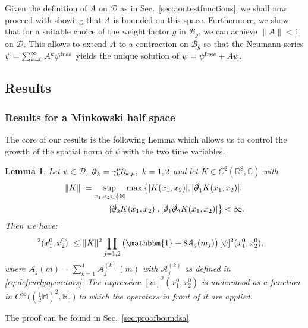 \documentclass[b5paper,draft,openbib,12pt]{memoir}
\newtheorem{Lemma}[Def]{Lemma}
\newcommand{\R}{\mathbb{R}}
\newcommand{\CC}{\mathbb{C}}
\newcommand{\M}{\mathbb{M}}
\newcommand{\id}{\mathbbm{1}}
\newcommand{\free}{{\textup free}}
\newcommand{\Banach}{\mathscr{B}}
\begin{document}
Given the definition of $A$ on $\mathscr{D}$ as in Sec.\ 
\ref{sec:aontestfunctions}, we shall now proceed with showing that 
$A$ is bounded on this space. Furthermore, we show that for a 
suitable choice of the weight factor $g$ in $\Banach_g$, we can 
achieve $\| A\| < 1$ on $\mathscr{D}$. This allows to extend $A$ to 
a contraction on $\Banach_g$ so that the Neumann series 
$\psi = \sum_{k=0}^\infty A^k \psi^\free$ yields the unique 
solution of $\psi = \psi^\free + A\psi$.

\subsection{Results} \label{sec:results}

\subsubsection{Results for a Minkowski half space} \label{sec:minkhalfspace}

The core of our results is the following Lemma which allows us to control the growth of the spatial norm of $\psi$ with the two time variables.

\begin{Lemma} \label{thm:boundsa} 
	Let $\psi \in \mathscr{D}$, $\slashed{\partial}_k = \gamma_k^\mu \partial_{k,\mu},~k=1,2$ and let $K \in C^2(\R^{8},\CC)$ with
	\begin{align}
    \| K \| := \sup_{x_1, x_2 \in \frac{1}{2}\M } \max \left\{ |K(x_1,x_2)|, |\slashed{\partial}_1 K(x_1,x_2)|,\right.\\
    \left. |\slashed{\partial}_2 K(x_1,x_2)|, |\slashed{\partial}_1 \slashed{\partial}_2 K(x_1,x_2)|\right\} < \infty.
	\label{eq:normk}
  \end{align}
Then we have:
\begin{align}
		[ A \psi]^2(x_1^0,x_2^0)  ~\leq ~& \|K\|^2 \prod_{j=1,2} \big( \id + 8\mathcal{A}_j(m_j) \big) \, [\psi]^2(x_1^0,x_2^0),
\label{eq:spatialnormapsi}
\end{align}
where $\mathcal{A}_j(m) = \sum_{k=1}^4\mathcal{A}_j^{(k)}(m)$ with 
$\mathcal{A}_j^{(k)}$ as defined in \eqref{eq:defcurlyoperators}. 
The expression $[\psi ]^2(x_1^0,x_2^0)$ is understood as a function in 
$C^\infty\big( (\tfrac{1}{2}\M)^2,\mathbb{R}^+_0\big)$ to which the operators in 
front of it are applied.
\end{Lemma}

The proof can be found in Sec.\ \ref{sec:proofboundsa}.
\end{document}
